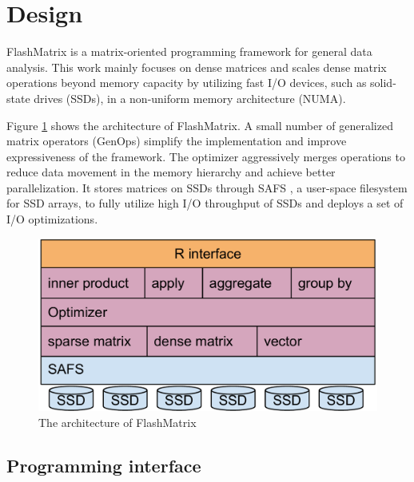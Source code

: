 \vspace{-10pt}
\section{Design}
\vspace{-5pt}

FlashMatrix is a matrix-oriented programming framework for general data analysis.
This work mainly focuses on dense matrices and scales dense matrix operations
beyond memory capacity by utilizing fast I/O devices, such as solid-state drives
(SSDs), in a non-uniform memory architecture (NUMA).

Figure \ref{fig:arch} shows the architecture of FlashMatrix. 
A small number of generalized matrix operators (GenOps)
 simplify the implementation and improve expressiveness of
the framework. The optimizer aggressively merges operations to
reduce data movement in the memory hierarchy and achieve better parallelization.
It stores matrices on SSDs through SAFS \cite{safs},
a user-space filesystem for SSD arrays, to fully utilize high I/O
throughput of SSDs and deploys a set of I/O optimizations.

\begin{figure}
\centering
\includegraphics[scale=0.3]{FlashMatrix_figs/architecture.pdf}
\vspace{-2pt}
\caption{The architecture of FlashMatrix}
\label{fig:arch}
\end{figure}

\vspace{-8pt}
\subsection{Programming interface}
\vspace{-4pt}

